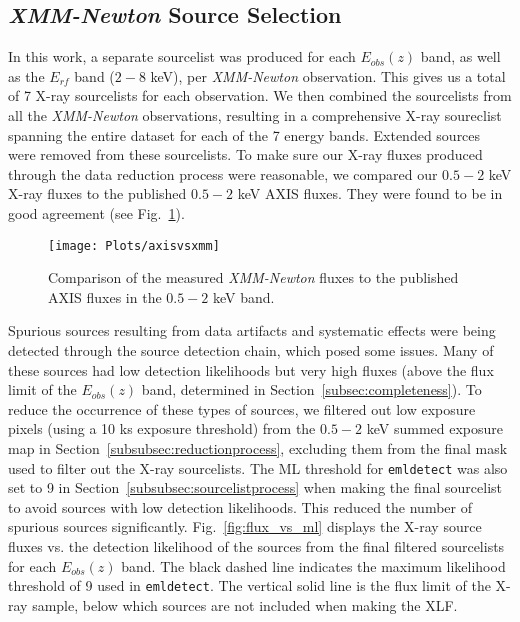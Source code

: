 \documentclass[fleqn,usenatbib]{mnras}
\begin{document}
    
    
    \subsection{\textit{XMM-Newton} Source Selection}\label{subsec:srcselect}
    
    
    In this work, a separate sourcelist was produced for each $E_{obs}(z)$ band, as well as the $E_{rf}$ band ($2-8$ keV), per \textit{XMM-Newton} observation.
    This gives us a total of 7 X-ray sourcelists for each observation.
    We then combined the sourcelists from all the \textit{XMM-Newton} observations, resulting in a comprehensive X-ray soureclist spanning the entire dataset for each of the 7 energy bands.
    Extended sources were removed from these sourcelists.
    To make sure our X-ray fluxes produced through the data reduction process were reasonable, we compared our $0.5-2$ keV X-ray fluxes to the published $0.5-2$ keV AXIS fluxes.
    They were found to be in good agreement (see Fig.~\ref{fig:axisvsxmm}).
    
        \begin{figure}
        \centering
          \texttt{[image: Plots/axisvsxmm]}
          \caption{Comparison of the measured \textit{XMM-Newton} fluxes to the published AXIS fluxes in the $0.5-2$ keV band.}
         \label{fig:axisvsxmm}
        \end{figure}    
    
    Spurious sources resulting from data artifacts and systematic effects were being detected through the source detection chain, which posed some issues. 
    Many of these sources had low detection likelihoods but very high fluxes (above the flux limit of the $E_{obs}(z)$ band, determined in Section~\ref{subsec:completeness}). 
    To reduce the occurrence of these types of sources, we filtered out low exposure pixels (using a 10 ks exposure threshold) from the $0.5-2$ keV summed exposure map in Section~\ref{subsubsec:reductionprocess}, excluding them from the final mask used to filter out the X-ray sourcelists.
    The ML threshold for \texttt{emldetect} was also set to 9 in Section~\ref{subsubsec:sourcelistprocess} when making the final sourcelist to avoid sources with low detection likelihoods.
    This reduced the number of spurious sources significantly.
    Fig.~\ref{fig:flux_vs_ml} displays the X-ray source fluxes vs. the detection likelihood of the sources from the final filtered sourcelists for each $E_{obs}(z)$ band. 
    The black dashed line indicates the maximum likelihood threshold of 9 used in \texttt{emldetect}.
    The vertical solid line is the flux limit of the X-ray sample, below which sources are not included when making the XLF. 
    
\end{document}
